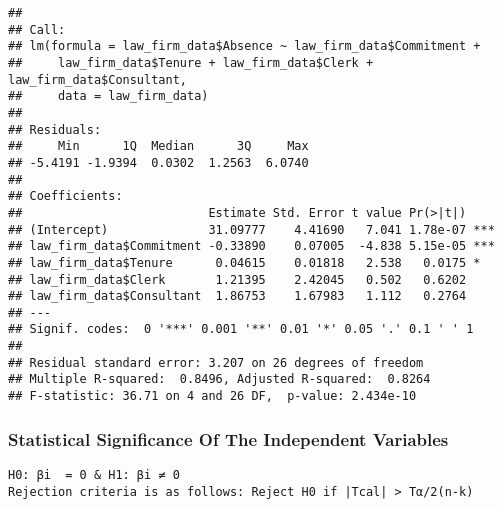 \documentclass[
]{article}
\newenvironment{Shaded}{\begin{snugshade}}{\end{snugshade}}
\newcommand{\AttributeTok}[1]{\textcolor[rgb]{0.77,0.63,0.00}{#1}}
\newcommand{\CommentTok}[1]{\textcolor[rgb]{0.56,0.35,0.01}{\textit{#1}}}
\newcommand{\FunctionTok}[1]{\textcolor[rgb]{0.00,0.00,0.00}{#1}}
\newcommand{\NormalTok}[1]{#1}
\newcommand{\OtherTok}[1]{\textcolor[rgb]{0.56,0.35,0.01}{#1}}
\newcommand{\SpecialCharTok}[1]{\textcolor[rgb]{0.00,0.00,0.00}{#1}}
\begin{document}
\begin{Shaded}
\end{Shaded}

\begin{verbatim}
## 
## Call:
## lm(formula = law_firm_data$Absence ~ law_firm_data$Commitment + 
##     law_firm_data$Tenure + law_firm_data$Clerk + law_firm_data$Consultant, 
##     data = law_firm_data)
## 
## Residuals:
##     Min      1Q  Median      3Q     Max 
## -5.4191 -1.9394  0.0302  1.2563  6.0740 
## 
## Coefficients:
##                          Estimate Std. Error t value Pr(>|t|)    
## (Intercept)              31.09777    4.41690   7.041 1.78e-07 ***
## law_firm_data$Commitment -0.33890    0.07005  -4.838 5.15e-05 ***
## law_firm_data$Tenure      0.04615    0.01818   2.538   0.0175 *  
## law_firm_data$Clerk       1.21395    2.42045   0.502   0.6202    
## law_firm_data$Consultant  1.86753    1.67983   1.112   0.2764    
## ---
## Signif. codes:  0 '***' 0.001 '**' 0.01 '*' 0.05 '.' 0.1 ' ' 1
## 
## Residual standard error: 3.207 on 26 degrees of freedom
## Multiple R-squared:  0.8496, Adjusted R-squared:  0.8264 
## F-statistic: 36.71 on 4 and 26 DF,  p-value: 2.434e-10
\end{verbatim}

\hypertarget{statistical-significance-of-the-independent-variables}{%
\subsubsection{Statistical Significance Of The Independent
Variables}\label{statistical-significance-of-the-independent-variables}}

\begin{verbatim}
H0: βi  = 0 & H1: βi ≠ 0
Rejection criteria is as follows: Reject H0 if |Tcal| > Tα/2(n-k)
\end{verbatim}
\end{document}

